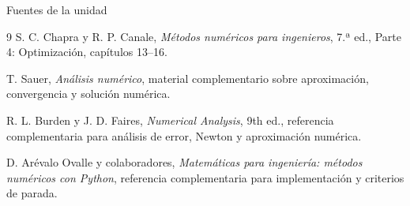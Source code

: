 \documentclass[../../main.tex]{subfiles}
\begin{document}
\begin{frame}{Fuentes de la unidad}
\footnotesize
\begin{thebibliography}{9}
S. C. Chapra y R. P. Canale,
\textit{Métodos numéricos para ingenieros}, 7.ª ed.,
Parte 4: Optimización, capítulos 13--16.

T. Sauer,
\textit{Análisis numérico},
material complementario sobre aproximación, convergencia y solución numérica.

R. L. Burden y J. D. Faires,
\textit{Numerical Analysis}, 9th ed.,
referencia complementaria para análisis de error, Newton y aproximación numérica.

D. Arévalo Ovalle y colaboradores,
\textit{Matemáticas para ingeniería: métodos numéricos con Python},
referencia complementaria para implementación y criterios de parada.
\end{thebibliography}
\end{frame}
\end{document}
